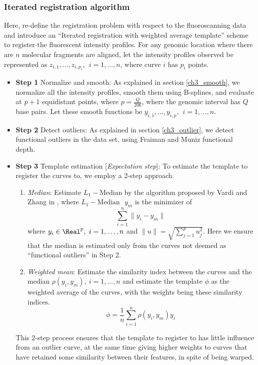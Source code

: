 \subsubsection{Iterated registration algorithm}
Here,  re-define the registration problem with respect to the fluoroscanning data and introduce an ``Iterated registration with weighted average template'' scheme to register the fluorescent intensity profiles.
For any genomic location where there are $n$ molecular fragments are aligned, let the intensity profiles observed be represented as $z_{i,1}, \dots, z_{i, p_i},\ \ i = 1,\dots, n$, where curve $i$ has $p_i$ points. 
\begin{itemize}
\item {\bf{Step 1}} Normalize and smooth: As explained in section \ref{ch3_smooth}, we normalize all the intensity profiles, smooth them using B-splines, and evaluate at $p + 1$ equidistant points, where $p = \frac{Q}{206}$, where the genomic interval has $Q$ base pairs. Let these smooth functions be $y_{i,1}, \dots, y_{i,p},\ \ i = 1,\dots,n$. 
\item {\bf{Step 2}} Detect outliers: As explained in section \ref{ch3_outlier}, we detect functional outliers in the data set, using Fraiman and Muniz functional depth. 
\item {\bf{Step 3}} Template estimation [{\emph{Expectation step}}]: To estimate the template to register the curves to, we employ a 2-step approach. 
\begin{enumerate}
\item {\emph{Median}}: Estimate $L_1-\text{Median}$ by the algorithm proposed by Vardi and Zhang in \cite{Vardi_Zhang_2000_PNAS}, where $L_1-\text{Median }$ $y_m$ is the minimizer of 
\[ \sum\limits_{i = 1}^n \|y_i - y_m \| \]
where $y_i \in \Real^p, \ i = 1,\dots,n$ and $\|u \| = \sqrt{\sum\limits_{j = 1}^p u_j^2}$. Here we ensure that the median is estimated only from the curves not deemed as ``functional outliers'' in Step 2. 
\item {\emph{Weighted mean}}: Estimate the similarity index between the curves and the median $\rho(y_i, y_m), \ i = 1,\dots,n$ and estimate the template $\phi$ as the weighted average of the curves, with the weights being these similarity indices. 
\[ \phi = \frac{1}{n}\sum\limits_{i = 1}^n \rho(y_i, y_m) y_i \]
\end{enumerate}
This 2-step process ensures that the template to register to has little influence from an outlier curve, at the same time giving higher weights to curves that have retained some similarity between their features, in spite of being warped. 

\end{itemize}
